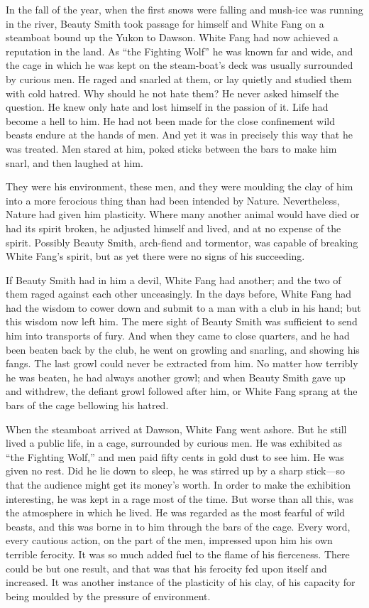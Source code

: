 \documentclass[10pt]{book}
\begin{document}
In the fall of the year, when the first snows were falling and mush-ice
was running in the river, Beauty Smith took passage for himself and
White Fang on a steamboat bound up the Yukon to Dawson. White Fang had
now achieved a reputation in the land. As “the Fighting Wolf” he was
known far and wide, and the cage in which he was kept on the
steam-boat’s deck was usually surrounded by curious men. He raged and
snarled at them, or lay quietly and studied them with cold hatred. Why
should he not hate them? He never asked himself the question. He knew
only hate and lost himself in the passion of it. Life had become a hell
to him. He had not been made for the close confinement wild beasts
endure at the hands of men. And yet it was in precisely this way that
he was treated. Men stared at him, poked sticks between the bars to
make him snarl, and then laughed at him.

They were his environment, these men, and they were moulding the clay
of him into a more ferocious thing than had been intended by Nature.
Nevertheless, Nature had given him plasticity. Where many another
animal would have died or had its spirit broken, he adjusted himself
and lived, and at no expense of the spirit. Possibly Beauty Smith,
arch-fiend and tormentor, was capable of breaking White Fang’s spirit,
but as yet there were no signs of his succeeding.

If Beauty Smith had in him a devil, White Fang had another; and the two
of them raged against each other unceasingly. In the days before, White
Fang had had the wisdom to cower down and submit to a man with a club
in his hand; but this wisdom now left him. The mere sight of Beauty
Smith was sufficient to send him into transports of fury. And when they
came to close quarters, and he had been beaten back by the club, he
went on growling and snarling, and showing his fangs. The last growl
could never be extracted from him. No matter how terribly he was
beaten, he had always another growl; and when Beauty Smith gave up and
withdrew, the defiant growl followed after him, or White Fang sprang at
the bars of the cage bellowing his hatred.

When the steamboat arrived at Dawson, White Fang went ashore. But he
still lived a public life, in a cage, surrounded by curious men. He was
exhibited as “the Fighting Wolf,” and men paid fifty cents in gold dust
to see him. He was given no rest. Did he lie down to sleep, he was
stirred up by a sharp stick—so that the audience might get its money’s
worth. In order to make the exhibition interesting, he was kept in a
rage most of the time. But worse than all this, was the atmosphere in
which he lived. He was regarded as the most fearful of wild beasts, and
this was borne in to him through the bars of the cage. Every word,
every cautious action, on the part of the men, impressed upon him his
own terrible ferocity. It was so much added fuel to the flame of his
fierceness. There could be but one result, and that was that his
ferocity fed upon itself and increased. It was another instance of the
plasticity of his clay, of his capacity for being moulded by the
pressure of environment.
\end{document}
